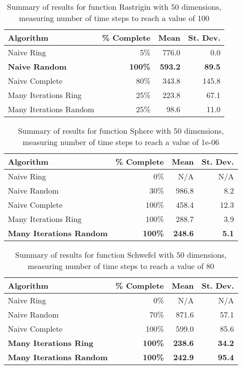 \documentclass[smallcondensed]{svjour3}
\begin{document}
\begin{table}
  \caption{Summary of results for function Rastrigin with 50 dimensions,
  measuring number of time steps to reach a value of 100}
  \label{tab:rastrigin-50}
  \centering
  \begin{tabular}{|l|r|r|r|}
  \hline
  Algorithm&\% Complete&Mean&St. Dev.\\
  \hline
  \hline
  Naive Ring&5\%&776.0&0.0\\
  \hline
  \textbf{Naive Random}&\textbf{100\%}&\textbf{593.2}&\textbf{89.5}\\
  \hline
  Naive Complete&80\%&343.8&145.8\\
  \hline
  Many Iterations Ring&25\%&223.8&67.1\\
  \hline
  Many Iterations Random&25\%&98.6&11.0\\
  \hline
  \end{tabular}
\end{table}

\begin{table}
  \caption{Summary of results for function Sphere with 50 dimensions,
  measuring number of time steps to reach a value of 1e-06}
  \label{tab:sphere-50}
  \centering
  \begin{tabular}{|l|r|r|r|}
  \hline
  Algorithm&\% Complete&Mean&St. Dev.\\
  \hline
  \hline
  Naive Ring&0\%&N/A&N/A\\
  \hline
  Naive Random&30\%&986.8&8.2\\
  \hline
  Naive Complete&100\%&458.4&12.3\\
  \hline
  Many Iterations Ring&100\%&288.7&3.9\\
  \hline
  \textbf{Many Iterations Random}&\textbf{100\%}&\textbf{248.6}&\textbf{5.1}\\
  \hline
  \end{tabular}
\end{table}

\begin{table}
  \caption{Summary of results for function Schwefel with 50 dimensions,
  measuring number of time steps to reach a value of 80}
  \label{tab:schwefel-50}
  \centering
  \begin{tabular}{|l|r|r|r|}
  \hline
  Algorithm&\% Complete&Mean&St. Dev.\\
  \hline
  \hline
  Naive Ring&0\%&N/A&N/A\\
  \hline
  Naive Random&70\%&871.6&57.1\\
  \hline
  Naive Complete&100\%&599.0&85.6\\
  \hline
  \textbf{Many Iterations Ring}&\textbf{100\%}&\textbf{238.6}&\textbf{34.2}\\
  \hline
  \textbf{Many Iterations Random}&\textbf{100\%}&\textbf{242.9}&\textbf{95.4}\\
  \hline
  \end{tabular}
\end{table}
\end{document}
